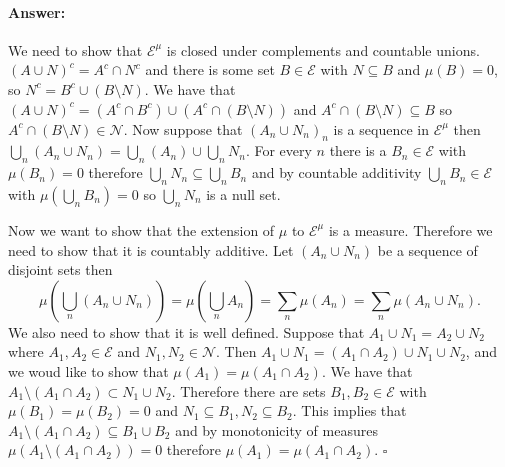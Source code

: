 \documentclass[11pt]{article}
\theoremstyle{definition}
\theoremstyle{remark}
\newenvironment{ans}{\paragraph{Answer:}}{\hfill$\square$}
\begin{document}
\begin{ans}
We need to show that $\mathcal{E}^\mu$ is closed under complements and countable unions. $(A \cup N)^c = A^c \cap N^c$ and there is some set $B \in \mathcal{E}$ with $N \subseteq B$ and $\mu(B) =0$, so $N^c = B^c \cup (B \setminus N)$. We have that $(A \cup N)^c = (A^c \cap B^c) \cup (A^c \cap (B \setminus N))$ and $A^c \cap (B \setminus N) \subseteq B$ so $A^c \cap (B \setminus N) \in \mathcal{N}$. Now suppose that $(A_n \cup N_n)_n$ is a sequence in $\mathcal{E}^\mu$ then $\bigcup_n (A_n \cup N_n)  = \bigcup_n (A_n) \cup \bigcup_n N_n$. For every $n$ there is a $B_n \in \mathcal{E}$ with $\mu(B_n) = 0$ therefore $\bigcup_n N_n \subseteq \bigcup_n B_n$ and by countable additivity $\bigcup_n B_n \in \mathcal{E}$ with $\mu(\bigcup_n B_n) = 0$ so $\bigcup_n N_n$ is a null set.

Now we want to show that the extension of $\mu$ to $\mathcal{E}^\mu$ is a measure. Therefore we need to show that it is countably additive. Let $(A_n \cup N_n)$ be a sequence of disjoint sets then 
\[ \mu( \bigcup_n(A_n \cup N_n)) = \mu(\bigcup_n A_n) = \sum_n \mu(A_n) = \sum_n \mu(A_n \cup N_n). \] We also need to show that it is well defined. Suppose that $A_1 \cup N_1 = A_2 \cup N_2$ where $A_1, A_2 \in \mathcal{E}$ and $N_1, N_2 \in \mathcal{N}$. Then $A_1 \cup N_1 = (A_1 \cap A_2) \cup N_1 \cup N_2$, and we woud like to show that $\mu(A_1) = \mu(A_1 \cap A_2)$. We have that $A_1 \setminus (A_1 \cap A_2) \subset N_1 \cup N_2$. Therefore there are sets $B_1, B_2 \in \mathcal{E}$ with $\mu(B_1) = \mu(B_2) = 0$ and $N_1 \subseteq B_1, N_2 \subseteq B_2$. This implies that $A_1 \setminus (A_1 \cap A_2)  \subseteq B_1 \cup B_2$ and by monotonicity of measures $\mu(A_1 \setminus (A_1 \cap A_2)) = 0$ therefore $\mu(A_1) = \mu(A_1 \cap A_2)$.
\end{ans}
\end{document}
